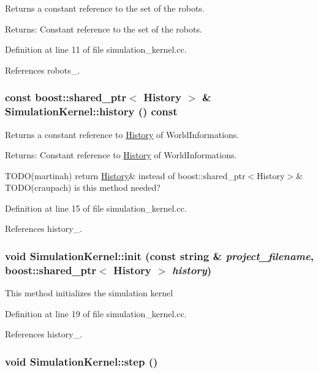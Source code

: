 Returns a constant reference to the set of the robots. \begin{Desc}
\item[Returns:]Constant reference to the set of the robots. \end{Desc}


Definition at line 11 of file simulation\_\-kernel.cc.

References robots\_\-.\hypertarget{class_simulation_kernel_70346340fc146d8582723ee05ee54f33}{
\subsubsection[history]{\setlength{\rightskip}{0pt plus 5cm}const boost::shared\_\-ptr$<$ {\bf History} $>$ \& SimulationKernel::history () const}}
\label{class_simulation_kernel_70346340fc146d8582723ee05ee54f33}


Returns a constant reference to \hyperlink{class_history}{History} of WorldInformations. \begin{Desc}
\item[Returns:]Constant reference to \hyperlink{class_history}{History} of WorldInformations.\end{Desc}
TODO(martinah) return \hyperlink{class_history}{History}\& instead of boost::shared\_\-ptr$<$History$>$\& TODO(craupach) is this method needed? 

Definition at line 15 of file simulation\_\-kernel.cc.

References history\_\-.\hypertarget{class_simulation_kernel_c6990f8bb4b86d3b04cb02e5581bc3e1}{
\subsubsection[init]{\setlength{\rightskip}{0pt plus 5cm}void SimulationKernel::init (const string \& {\em project\_\-filename}, \/  boost::shared\_\-ptr$<$ {\bf History} $>$ {\em history})}}
\label{class_simulation_kernel_c6990f8bb4b86d3b04cb02e5581bc3e1}


This method initializes the simulation kernel 

Definition at line 19 of file simulation\_\-kernel.cc.

References history\_\-.\hypertarget{class_simulation_kernel_b1d2477386ccc99d784f1d4fce87691d}{
\subsubsection[step]{\setlength{\rightskip}{0pt plus 5cm}void SimulationKernel::step ()}}
\label{class_simulation_kernel_b1d2477386ccc99d784f1d4fce87691d}


